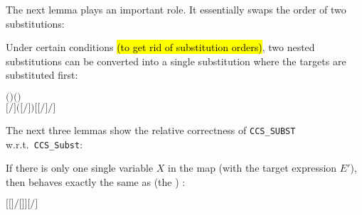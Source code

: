 The next lemma plays an important role. It essentially swaps the order of two substitutions:
\begin{lemma}
Under certain conditions \hl{(to get rid of substitution orders)}, two nested substitutions can be
converted into a single substitution where the targets are substituted first:
\begin{alltt}
\HOLTokenTurnstile{}   \HOLSymConst{\HOLTokenConj{}}   \HOLSymConst{\ensuremath{=}}   \HOLSymConst{\HOLTokenConj{}}   \HOLSymConst{\ensuremath{=}}   \HOLSymConst{\HOLTokenConj{}}
    \ensuremath{(} \ensuremath{)} \ensuremath{(} \ensuremath{)} \HOLSymConst{\HOLTokenImp{}}
   \ensuremath{[}\ensuremath{/}\ensuremath{]} \ensuremath{(}\ensuremath{[}\ensuremath{/}\ensuremath{]} \ensuremath{)} \HOLSymConst{\ensuremath{=}} \ensuremath{[} \ensuremath{[}\ensuremath{/}\ensuremath{]} \ensuremath{/}\ensuremath{]} 
\end{alltt}
\end{lemma}

The next three lemmas show the relative correctness of \texttt{CCS\_SUBST}
w.r.t.~\texttt{CCS\_Subst}:
\begin{lemma}
  If there is only one single variable $X$ in the map (with the target
  expression $E'$), then  behaves exactly the
  same as (the \univariate) :
\begin{alltt}
\HOLTokenTurnstile{} \ensuremath{[}\ensuremath{[}\ensuremath{]}\ensuremath{/}\ensuremath{[}\ensuremath{]}\ensuremath{]}  \HOLSymConst{\ensuremath{=}} \ensuremath{[}\ensuremath{/}\ensuremath{]} 
\end{alltt}
\end{lemma}

